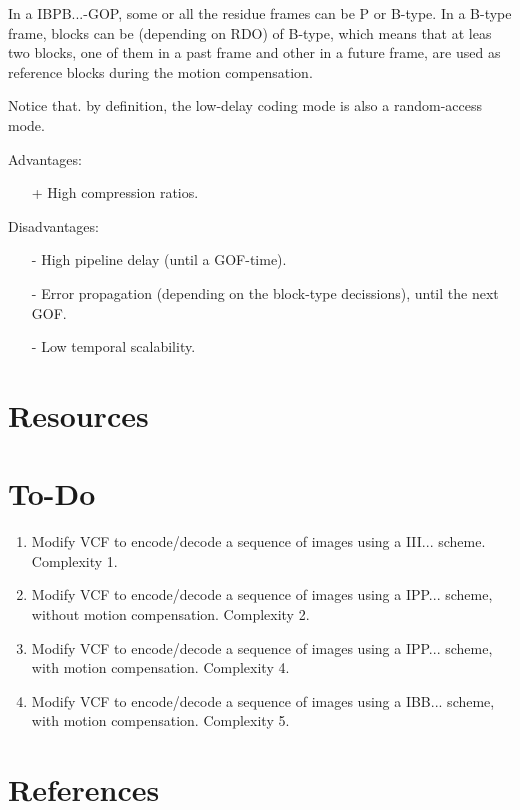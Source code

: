 In a IBPB...-GOP, some or all the residue frames can be P or
B-type. In a B-type frame, blocks can be (depending on RDO) of B-type,
which means that at leas two blocks, one of them in a past frame and
other in a future frame, are used as reference blocks during the
motion compensation.

Notice that. by definition, the low-delay coding mode is also a
random-access mode.

Advantages:
\begin{itemize}
\item [+] High compression ratios.
\end{itemize}

Disadvantages:
\begin{enumerate}
\item [-] High pipeline delay (until a GOF-time).
\item [-] Error propagation (depending on the block-type decissions),
  until the next GOF.
\item [-] Low temporal scalability.
\end{enumerate}

\section{Resources}

\section{To-Do}

\begin{enumerate}
\item Modify VCF to encode/decode a sequence of images using a
  III... scheme. Complexity 1.
\item Modify VCF to encode/decode a sequence of images using a
  IPP... scheme, without motion compensation. Complexity 2.
\item Modify VCF to encode/decode a sequence of images using a
  IPP... scheme, with motion compensation. Complexity 4.
\item Modify VCF to encode/decode a sequence of images using a
  IBB... scheme, with motion compensation. Complexity 5.
\end{enumerate}

  
\section{References}

\renewcommand{\addcontentsline}[3]{}%


